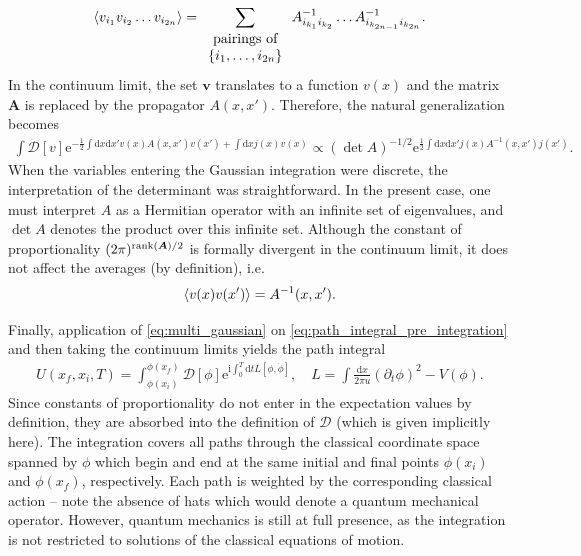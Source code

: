\documentclass{svmono}
\def\ri{\mathrm i}
\def\re{\mathrm e}
\def\rd{\mathrm d}
\def\rD{\mathcal D}
\providecommand{\DIFaddbegin}{} %
\providecommand{\DIFaddend}{} %
\providecommand{\DIFdelend}{} %
\newcommand{\DIFaddincludegraphics}[2][]{{\color{blue}\fbox{\DIFOincludegraphics[#1]{#2}}}} %
\DeclareRobustCommand{\DIFaddbegin}{\DIFOaddbegin \let\includegraphics\DIFaddincludegraphics} %
\DeclareRobustCommand{\DIFaddend}{\DIFOaddend \let\includegraphics\DIFOincludegraphics} %
\DeclareRobustCommand{\DIFdelend}{\DIFOaddend \let\includegraphics\DIFOincludegraphics} %
\begin{document}
\DIFdelend \DIFaddbegin \begin{align}
    \braket{v_{i_1}v_{i_2}\dots v_{i_{2n}}} =
    \sum_{\begin{array}{c}\text{pairings of}\\ \{i_1,\dots,i_{2n}\}\end{array}}
    A^{-1}_{i_{k_1}i_{k_2}}\dots A^{-1}_{i_{k_{2n-1}}i_{k_{2n}}}.
\end{align}\DIFaddend 
In the continuum limit, the set $\bm v$ translates to a function $v(x)$ and the matrix $\bm A$ is replaced by the propagator $A(x,x')$.
Therefore, the natural generalization becomes
\begin{align}
    \int\rD[v]\re^{-\frac12\int\rd x\rd x' v(x)A(x,x')v(x')+\int\rd x j(x) v(x)}
    \propto
    (\det A)^{-1/2}\re^{\frac12\int\rd x\rd x' j(x) A^{-1}(x,x')j(x')}.
    \label{eq:field_source}
\end{align}
When the variables entering the Gaussian integration were discrete, the interpretation of the determinant was straightforward.
In the present case, one must interpret $A$ as a Hermitian operator with an infinite set of eigenvalues, and $\det A$ denotes the product over this infinite set.
Although the constant of proportionality $(2\pi)^{{\rm rank}(\bm A)/2}$ is formally divergent in the continuum limit, it does not affect the averages (by definition), i.e.
\begin{align}
    \braket{v(x)v(x')} = A^{-1}(x,x').
\end{align}

Finally, application of \cref{eq:multi_gaussian} on \cref{eq:path_integral_pre_integration} and then taking the continuum limits yields the path integral
\begin{align}
    U(x_f,x_i,T)
    =
    \int_{\phi(x_i)}^{\phi(x_f)}{\rD[\phi]}
    \re^{\ri\int_0^T\rd tL[\phi,\dot\phi]}
    ,\quad
    L = \int\frac{\rd x}{2\pi u}(\partial_t\phi)^2 - V(\phi).
    \label{eq:time_evolution_kernel_path_integral}
\end{align}
Since constants of proportionality do not enter in the expectation values by definition, they are absorbed into the definition of $\rD$ (which is given implicitly here).
The integration covers all paths through the classical coordinate space spanned by $\phi$ which begin and end at the same initial and final points $\phi(x_i)$ and $\phi(x_f)$, respectively.
Each path is weighted by the corresponding classical action -- note the absence of hats which would denote a quantum mechanical operator.
However, quantum mechanics is still at full presence, as the integration is not restricted to solutions of the classical equations of motion.
\end{document}
